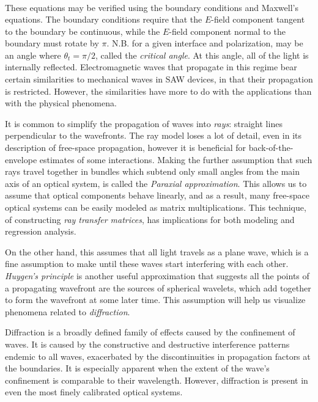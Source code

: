 \documentclass[a4paper,10pt]{report}
\numberwithin{equation}{section}
\begin{document}
{\begin{section}
\begin{align}
\end{align}
These equations may be verified using the boundary conditions and Maxwell's equations. The boundary conditions require that the $E$-field component tangent to the boundary be continuous, while the $E$-field component normal to the boundary must rotate by $\pi$. N.B. for a given interface and polarization, may be an angle where $\theta_t = \pi / 2$, called the \emph{critical angle}. At this angle, all of the light is internally reflected. \cite[p.~112]{Hecht1987} Electromagnetic waves that propagate in this regime bear certain similarities to mechanical waves in SAW devices, in that their propagation is restricted. However, the similarities have more to do with the applications than with the physical phenomena. \cite[p.~440]{Kino1987}
\par
It is common to simplify the propagation of waves into \emph{rays}: straight lines perpendicular to the wavefronts. The ray model loses a lot of detail, even in its description of free-space propagation, however it is beneficial for back-of-the-envelope estimates of some interactions. \cite[p.~95]{Hecht1987} Making the further assumption that such rays travel together in bundles which subtend only small angles from the main axis of an optical system, is called the \emph{Paraxial approximation}. This allows us to assume that optical components behave linearly, and as a result, many free-space optical systems can be easily modeled as matrix multiplications. \cite[p.~444]{Goodman2005} This technique, of constructing \emph{ray transfer matrices}, has implications for both modeling and regression analysis.
\par
On the other hand, this assumes that all light travels as a plane wave, which is a fine assumption to make until these waves start interfering with each other. \emph{Huygen's principle} is another useful approximation that suggests all the points of a propagating wavefront are the sources of spherical wavelets, which add together to form the wavefront at some later time. This assumption will help us visualize phenomena related to \emph{diffraction}. \cite[p.~100]{Hecht1987}
\par
Diffraction is a broadly defined family of effects caused by the confinement of waves. It is caused by the constructive and destructive interference patterns endemic to all waves, exacerbated by the discontinuities in propagation factors at the boundaries. It is especially  apparent when the extent of the wave's confinement is comparable to their wavelength. \cite[p.~32]{Goodman2005} However, diffraction is present in even the most finely calibrated optical systems. 

\end{section}}
\end{document}
